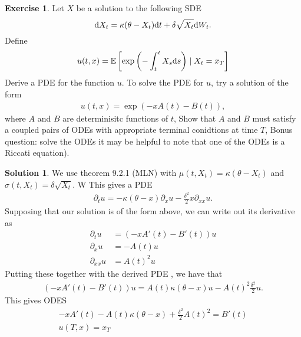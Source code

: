 \documentclass[12pt]{article}
\newcommand{\Expect}{\mathbb{E}}
\def\rd{{\rm d}}
\theoremstyle{definition}
\newtheorem{exer}{Exercise}
\newtheorem{sol}{Solution}
\theoremstyle{remark}
\def\d{{\rm d}}
\begin{document}
\begin{exer}
Let $X$ be a solution to the following SDE
 \begin{equation*}
     \rd X_{t} = \kappa (\theta - X_{t}) \d t + \delta \sqrt{X_{t}} \rd W_{t}.
\end{equation*}
Define
\begin{align*}
    u(t, x) = \Expect\left[ \exp \left( - \int_{t}^{t} X_{s} \rd s  \right ) \mid X_{t} = x_{T} \right]
\end{align*}
Derive a PDE for the function $u$. To solve the PDE for $u$, try a solution of the form
\begin{align*}
    u(t, x) = \exp( -x A(t) - B(t) ),
\end{align*}
where $A$ and  $B$ are determinisitc functions of  $t$, Show that $A$ and  $B$ must satisfy a coupled pairs of ODEs with appropriate terminal conidtions at time  $T$, Bonus question: solve the ODEs it may be helpful to note that one of the ODEs is a Riccati equation).
\end{exer}

\begin{sol}
    We use theorem 9.2.1 (MLN) with $\mu(t, X_{t}) = \kappa(\theta - X_{t})$ and $\sigma(t, X_{t}) = \delta \sqrt{X_{t}}$. W This gives a PDE
    \begin{align*}
        \partial_{t} u = - \kappa(\theta - x) \partial_{x} u - \frac{\delta^{2}}{2} x \partial_{xx} u.
    \end{align*}
    Supposing that our solution is of the form above, we can write out its derivative as
    \begin{align*}
        \partial_{t} u &=  (-x A'(t) - B'(t))u\\
        \partial_{x} u &= - A(t) u\\
        \partial_{xx} u &= A(t)^{2} u
    \end{align*}
    Putting these together with the derived PDE , we have that
    \begin{align*}
        (-x A'(t) - B'(t)) u = A(t) \kappa(\theta - x) u - A(t)^{2} \frac{\delta^{2}}{2} u.
    \end{align*}
    This gives ODES
    \begin{align*}
        -x A'(t) - A(t) \kappa(\theta - x) + \frac{\delta^{2}}{2} A(t)^{2} = B'(t)\\
        u(T, x) = x_{T}
    \end{align*}
\end{sol}
\newpage
\end{document}

